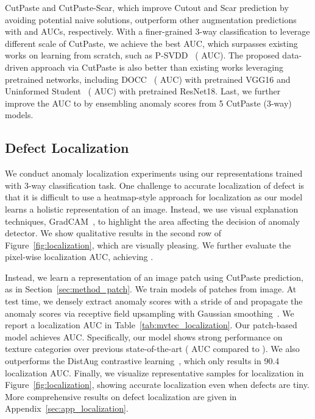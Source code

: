 \documentclass[final]{cvpr}
\begin{document}
CutPaste and CutPaste-Scar, which improve Cutout and Scar prediction by avoiding potential naive solutions, outperform other augmentation predictions with  and  AUCs, respectively. With a finer-grained 3-way classification to leverage different scale of CutPaste, we achieve the best  AUC, which surpasses existing works on learning from scratch, such as P-SVDD~\cite{yi2020patch} ( AUC).  
The proposed data-driven approach via CutPaste is also better than existing works leveraging pretrained networks, including
DOCC~\cite{ruff2020unifying} ( AUC) with pretrained VGG16 and Uninformed Student~\cite{bergmann2020uninformed} ( AUC) with pretrained ResNet18.  
Last, we further improve the AUC to  by ensembling anomaly scores from 5 CutPaste (3-way) models.

\subsection{Defect Localization}
\label{sec:exp_localization}
We conduct anomaly localization experiments using our representations trained with 3-way classification task. 
One challenge to accurate localization of defect is that it is difficult to use a heatmap-style approach for localization as our model learns a holistic representation of an image. Instead, we use visual explanation techniques, GradCAM~\cite{selvaraju2017grad}, to highlight the area affecting the decision of anomaly detector. We show qualitative results in the second row of Figure~\ref{fig:localization}, which are visually pleasing. We further evaluate the pixel-wise localization AUC, achieving .

Instead, we learn a representation of an image patch using CutPaste prediction, as in Section~\ref{sec:method_patch}. 
We train models of  patches from  image.
At test time, we densely extract anomaly scores with a stride of  and propagate  the anomaly scores via receptive field upsampling with Gaussian smoothing~\cite{liznerski2020explainable}. 
We report a localization AUC in Table~\ref{tab:mvtec_localization}.
Our patch-based model achieves  AUC. Specifically, our model shows strong performance on texture categories over previous state-of-the-art ( AUC compared to ). 
We also outperforms the DistAug contrastive learning~\cite{sohn2020learning}, which only results in 90.4 localization AUC.
Finally, we visualize representative samples for localization in Figure~\ref{fig:localization}, showing accurate localization even when defects are tiny. More comprehensive results on defect localization are given in Appendix~\ref{sec:app_localization}.
\end{document}
